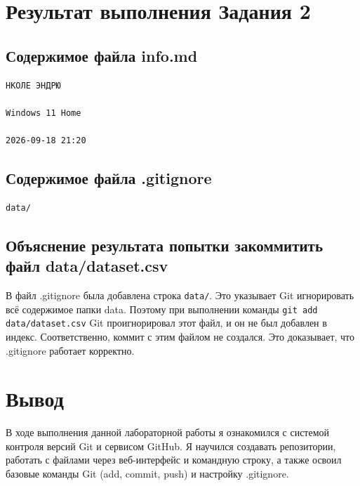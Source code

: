 \documentclass[a4paper,12pt]{article}
\begin{document}
\section{Результат выполнения Задания 2}
\subsection{Содержимое файла info.md}
\begin{verbatim}
НКОЛЕ ЭНДРЮ

Windows 11 Home

2026-09-18 21:20
\end{verbatim}

\subsection{Содержимое файла .gitignore}
\begin{verbatim}
data/
\end{verbatim}

\subsection{Объяснение результата попытки закоммитить файл data/dataset.csv}
В файл .gitignore была добавлена строка \texttt{data/}. Это указывает Git игнорировать всё содержимое папки data. Поэтому при выполнении команды \texttt{git add data/dataset.csv} Git проигнорировал этот файл, и он не был добавлен в индекс. Соответственно, коммит с этим файлом не создался. Это доказывает, что .gitignore работает корректно.

\section{Вывод}
В ходе выполнения данной лабораторной работы я ознакомился с системой контроля версий Git и сервисом GitHub. Я научился создавать репозитории, работать с файлами через веб-интерфейс и командную строку, а также освоил базовые команды Git (add, commit, push) и настройку .gitignore.
\end{document}

